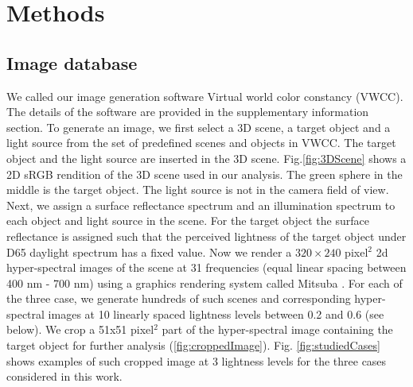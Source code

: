 \documentclass{jov}
\begin{document}
\section{Methods}
\subsection{Image database} \label{method:VirtualWorld}
We called our image generation software Virtual world color constancy (VWCC). The details of the software are provided in the supplementary information section. To generate an image, we first select a 3D scene, a target object and a light source from the set of predefined scenes and objects in VWCC. The target object and the light source are inserted in the 3D scene. Fig.\ref{fig:3DScene} shows a 2D sRGB rendition of the 3D scene used in our analysis. The green sphere in the middle is the target object. The light source is not in the camera field of view. Next, we assign a surface reflectance spectrum and an illumination spectrum to each object and light source in the scene. For the target object the surface reflectance is assigned such that the perceived lightness of the target object under D65 daylight spectrum has a fixed value. Now we render a $320\times 240$ pixel$^2$ 2d hyper-spectral images of the scene at 31 frequencies (equal linear spacing between 400 nm - 700 nm) using a graphics rendering system called Mitsuba \cite{jakob2015mitsuba}. For each of the three case, we generate hundreds of such scenes and corresponding hyper-spectral images at 10 linearly spaced lightness levels between 0.2 and 0.6 (see below). We crop a 51x51 pixel$^2$ part of the hyper-spectral image containing the target object for further analysis (\ref{fig:croppedImage}). Fig. \ref{fig:studiedCases} shows examples of such cropped image at 3 lightness levels for the three cases considered in this work.
\end{document}
